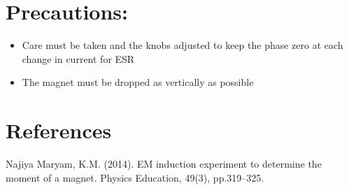 \documentclass{multi}
\begin{document}
\section{Precautions:}
\begin{itemize}
	\item Care must be taken and the knobs adjusted to keep the phase zero at each change in current for ESR
	\item The magnet must be dropped as vertically as possible
\end{itemize}
\section{References}
Najiya Maryam, K.M. (2014). EM induction experiment to determine the moment of a magnet. Physics Education, 49(3), pp.319–325.
‌
\end{document}
